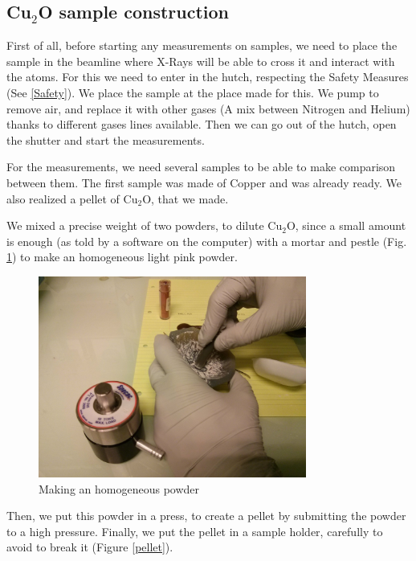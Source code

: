 \documentclass[11pt,a4paper,oneside]{report}
\begin{document}
\subsection{Cu$_2$O sample construction}
First of all, before starting any measurements on samples, we need to place the sample in the beamline where X-Rays will be able to cross it and interact with the atoms. For this we need to enter in the hutch, respecting the Safety Measures (See \ref{Safety}). We place the sample at the place made for this. We pump to remove air, and replace it with other gases (A mix between Nitrogen and Helium) thanks to different gases lines available. Then we can go out of the hutch, open the shutter and start the measurements.

For the measurements, we need several samples to be able to make comparison between them. The first sample was made of Copper and was already ready. We also realized a pellet of Cu$_2$O, that we made.

 We mixed a precise weight of two powders, to dilute Cu$_2$O, since a small amount is enough (as told by a software on the computer) with a mortar and pestle (Fig. \ref{MixMortier}) to make an homogeneous light pink powder.

\begin{figure}[H]
    \centering
    \includegraphics[width=250pt]{Images/pellet1.jpg}
    \caption{Making an homogeneous powder}
    \label{MixMortier}
\end{figure}


Then, we put this powder in a press, to create a pellet by submitting the powder to a high pressure. Finally, we put the pellet in a sample holder, carefully to avoid to break it (Figure \ref{pellet}).
\end{document}
